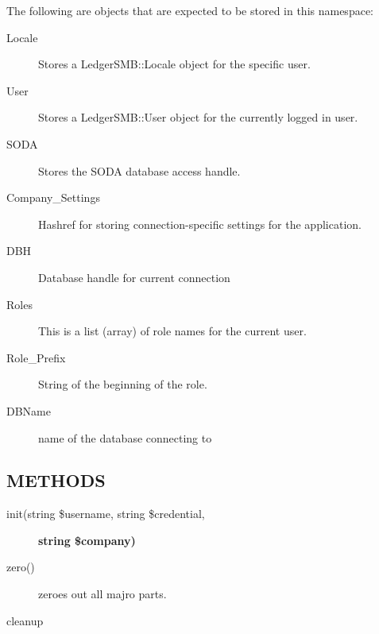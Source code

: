 \begin{description}
\begin{description}
\begin{description}
\begin{description}
\begin{description}
The following are objects that are expected to be stored in this namespace:

\begin{description}

\item[{Locale}] \mbox{}

Stores a LedgerSMB::Locale object for the specific user.


\item[{User}] \mbox{}

Stores a LedgerSMB::User object for the currently logged in user.


\item[{SODA}] \mbox{}

Stores the SODA database access handle.


\item[{Company\_Settings}] \mbox{}

Hashref for storing connection-specific settings for the application.


\item[{DBH}] \mbox{}

Database handle for current connection


\item[{Roles}] \mbox{}

This is a list (array) of role names for the current user.


\item[{Role\_Prefix}] \mbox{}

String of the beginning of the role.


\item[{DBName}] \mbox{}

name of the database connecting to

\end{description}
\subsection*{METHODS\label{LedgerSMB::App_State_METHODS}}
\begin{description}

\item[{init(string \$username, string \$credential,}] \textbf{string \$company)}
\item[{zero()}] \mbox{}

zeroes out all majro parts.


\item[{cleanup}] \mbox{}


\end{description}
\end{description}
\end{description}
\end{description}
\end{description}
\end{description}
